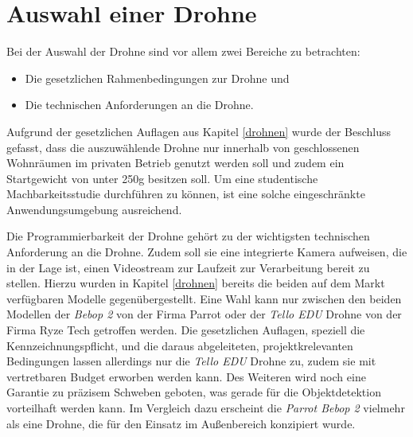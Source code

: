 \section{Auswahl einer Drohne} \label{drone_selection}

Bei der Auswahl der Drohne sind vor allem zwei Bereiche zu betrachten:

\begin{itemize}
	\item Die gesetzlichen Rahmenbedingungen zur Drohne und
	\item Die technischen Anforderungen an die Drohne.
\end{itemize}

Aufgrund der gesetzlichen Auflagen aus Kapitel \ref{drohnen} wurde der Beschluss gefasst, dass die auszuwählende Drohne nur innerhalb von geschlossenen Wohnräumen im privaten Betrieb genutzt werden soll und zudem ein Startgewicht von unter 250g besitzen soll. Um eine studentische Machbarkeitsstudie durchführen zu können, ist eine solche eingeschränkte Anwendungsumgebung ausreichend. 

Die Programmierbarkeit der Drohne gehört zu der wichtigsten technischen Anforderung an die Drohne. Zudem soll sie eine integrierte Kamera aufweisen, die in der Lage ist, einen Videostream zur Laufzeit zur Verarbeitung bereit zu stellen. Hierzu wurden in Kapitel \ref{drohnen} bereits die beiden auf dem Markt verfügbaren Modelle  gegenübergestellt. Eine Wahl kann nur zwischen den beiden Modellen der \textit{Bebop 2} von der Firma Parrot oder der \textit{Tello EDU} Drohne von der Firma Ryze Tech getroffen werden. Die gesetzlichen Auflagen, speziell die Kennzeichnungspflicht, und die daraus abgeleiteten, projektkrelevanten Bedingungen lassen allerdings nur die \textit{Tello EDU} Drohne zu, zudem sie mit vertretbaren Budget erworben werden kann. Des Weiteren wird noch eine Garantie zu präzisem Schweben geboten, was gerade für die Objektdetektion vorteilhaft werden kann. Im Vergleich dazu erscheint die \textit{Parrot Bebop 2} vielmehr als eine Drohne, die für den Einsatz im Außenbereich konzipiert wurde.
